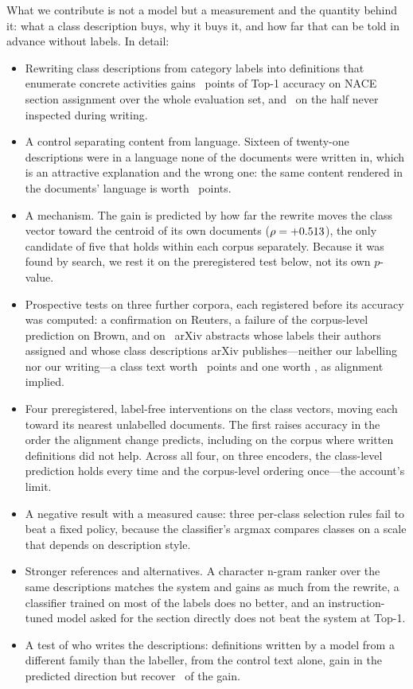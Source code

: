 \documentclass[11pt]{article}
\begin{document}
What we contribute is not a model but a measurement and the quantity behind
it: what a class description buys, why it buys it, and how far that can be
told in advance without labels. In detail:
\begin{itemize}
  \item Rewriting class descriptions from category labels into definitions that
        enumerate concrete activities gains \ContentEffect~points of Top-1
        accuracy on NACE section assignment over the whole evaluation set, and
        \HeldOutContentEffect\ on the half never inspected during writing.
  \item A control separating content from language. Sixteen of twenty-one
        descriptions were in a language none of the documents were written in,
        which is an attractive explanation and the wrong one: the same content
        rendered in the documents' language is worth \LanguageEffect~points.
  \item A mechanism. The gain is predicted by how far the rewrite moves the
        class vector toward the centroid of its own documents
        ($\rho = +0.513$), the only candidate of five that holds within
        each corpus separately. Because it was found by search, we rest it on
        the preregistered test below, not its own $p$-value.
  \item Prospective tests on three further corpora, each registered before its
        accuracy was computed: a confirmation on Reuters, a failure of the
        corpus-level prediction on Brown, and on \ArxivN\ arXiv abstracts whose
        labels their authors assigned and whose class descriptions arXiv
        publishes---neither our labelling nor our writing---a class text
        worth \ArxivSpellGain~points and one worth \ArxivDescGain, as
        alignment implied.
  \item Four preregistered, label-free interventions on the class vectors,
        moving each toward its nearest unlabelled documents. The first raises
        accuracy in the order the alignment change predicts, including on the
        corpus where written definitions did not help. Across all four, on three
        encoders, the class-level prediction holds every time and the
        corpus-level ordering once---the account's limit.
  \item A negative result with a measured cause: three per-class selection
        rules fail to beat a fixed policy, because the classifier's argmax
        compares classes on a scale that depends on description style.
  \item Stronger references and alternatives. A character n-gram ranker over
        the same descriptions matches the system and gains as much from the
        rewrite, a classifier trained on most of the labels does no better, and
        an instruction-tuned model asked for the section directly does not beat
        the system at Top-1.
  \item A test of who writes the descriptions: definitions written by a model
        from a different family than the labeller, from the control text alone,
        gain in the predicted direction but recover \SourceWriterShare\ of the
        gain.
\end{itemize}
\end{document}
